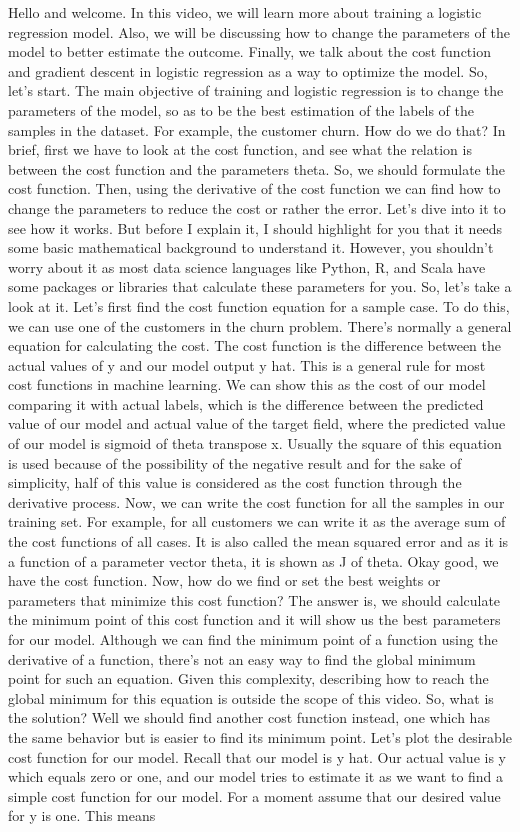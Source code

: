 	
	Hello and welcome. In this video, we will learn more about training a logistic regression model. Also, we will be discussing how to change the parameters of the model to better estimate the outcome. Finally, we talk about the cost function and gradient descent in logistic regression as a way to optimize the model. So, let's start. The main objective of training and logistic regression is to change the parameters of the model, so as to be the best estimation of the labels of the samples in the dataset. For example, the customer churn. How do we do that? In brief, first we have to look at the cost function, and see what the relation is between the cost function and the parameters theta. So, we should formulate the cost function. Then, using the derivative of the cost function we can find how to change the parameters to reduce the cost or rather the error. Let's dive into it to see how it works. But before I explain it, I should highlight for you that it needs some basic mathematical background to understand it. However, you shouldn't worry about it as most data science languages like Python, R, and Scala have some packages or libraries that calculate these parameters for you. So, let's take a look at it. Let's first find the cost function equation for a sample case. To do this, we can use one of the customers in the churn problem. There's normally a general equation for calculating the cost. The cost function is the difference between the actual values of y and our model output y hat. This is a general rule for most cost functions in machine learning. We can show this as the cost of our model comparing it with actual labels, which is the difference between the predicted value of our model and actual value of the target field, where the predicted value of our model is sigmoid of theta transpose x. Usually the square of this equation is used because of the possibility of the negative result and for the sake of simplicity, half of this value is considered as the cost function through the derivative process. Now, we can write the cost function for all the samples in our training set. For example, for all customers we can write it as the average sum of the cost functions of all cases. It is also called the mean squared error and as it is a function of a parameter vector theta, it is shown as J of theta. Okay good, we have the cost function. Now, how do we find or set the best weights or parameters that minimize this cost function? The answer is, we should calculate the minimum point of this cost function and it will show us the best parameters for our model. Although we can find the minimum point of a function using the derivative of a function, there's not an easy way to find the global minimum point for such an equation. Given this complexity, describing how to reach the global minimum for this equation is outside the scope of this video. So, what is the solution? Well we should find another cost function instead, one which has the same behavior but is easier to find its minimum point. Let's plot the desirable cost function for our model. Recall that our model is y hat. Our actual value is y which equals zero or one, and our model tries to estimate it as we want to find a simple cost function for our model. For a moment assume that our desired value for y is one. This means 